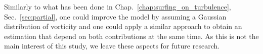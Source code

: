 Similarly to what has been done in Chap.~\ref{chap:surfing_on_turbulence}, Sec.~\ref{sec:partial}, one could improve the model by assuming a Gaussian distribution of vorticity and one could apply a similar approach to obtain an estimation that depend on both contributions at the same time.
As this is not the main interest of this study, we leave these aspects for future research.


% 
